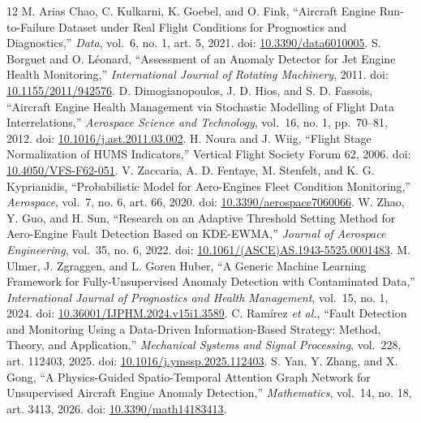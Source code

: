 \documentclass[preprint,12pt]{elsarticle}
\begin{document}
\begin{thebibliography}{12}
\small\setlength{\itemsep}{0pt}
 M. Arias Chao, C. Kulkarni, K. Goebel, and O. Fink, ``Aircraft Engine Run-to-Failure Dataset under Real Flight Conditions for Prognostics and Diagnostics,'' \emph{Data}, vol.~6, no. 1, art. 5, 2021. doi: \href{https://doi.org/10.3390/data6010005}{10.3390/data6010005}.
 S. Borguet and O. Léonard, ``Assessment of an Anomaly Detector for Jet Engine Health Monitoring,'' \emph{International Journal of Rotating Machinery}, 2011. doi: \href{https://doi.org/10.1155/2011/942576}{10.1155/2011/942576}.
 D. Dimogianopoulos, J. D. Hios, and S. D. Fassois, ``Aircraft Engine Health Management via Stochastic Modelling of Flight Data Interrelations,'' \emph{Aerospace Science and Technology}, vol.~16, no. 1, pp.~70--81, 2012. doi: \href{https://doi.org/10.1016/j.ast.2011.03.002}{10.1016/j.ast.2011.03.002}.
 H. Noura and J. Wiig, ``Flight Stage Normalization of HUMS Indicators,'' Vertical Flight Society Forum 62, 2006. doi: \href{https://doi.org/10.4050/VFS-F62-051}{10.4050/VFS-F62-051}.
 V. Zaccaria, A. D. Fentaye, M. Stenfelt, and K. G. Kyprianidis, ``Probabilistic Model for Aero-Engines Fleet Condition Monitoring,'' \emph{Aerospace}, vol.~7, no. 6, art. 66, 2020. doi: \href{https://doi.org/10.3390/aerospace7060066}{10.3390/aerospace7060066}.
 W. Zhao, Y. Guo, and H. Sun, ``Research on an Adaptive Threshold Setting Method for Aero-Engine Fault Detection Based on KDE-EWMA,'' \emph{Journal of Aerospace Engineering}, vol.~35, no. 6, 2022. doi: \href{https://doi.org/10.1061/(ASCE)AS.1943-5525.0001483}{10.1061/(ASCE)AS.1943-5525.0001483}.
 M. Ulmer, J. Zgraggen, and L. Goren Huber, ``A Generic Machine Learning Framework for Fully-Unsupervised Anomaly Detection with Contaminated Data,'' \emph{International Journal of Prognostics and Health Management}, vol.~15, no. 1, 2024. doi: \href{https://doi.org/10.36001/IJPHM.2024.v15i1.3589}{10.36001/IJPHM.2024.v15i1.3589}.
 C. Ramírez \emph{et al.}, ``Fault Detection and Monitoring Using a Data-Driven Information-Based Strategy: Method, Theory, and Application,'' \emph{Mechanical Systems and Signal Processing}, vol.~228, art. 112403, 2025. doi: \href{https://doi.org/10.1016/j.ymssp.2025.112403}{10.1016/j.ymssp.2025.112403}.
 S. Yan, Y. Zhang, and X. Gong, ``A Physics-Guided Spatio-Temporal Attention Graph Network for Unsupervised Aircraft Engine Anomaly Detection,'' \emph{Mathematics}, vol.~14, no. 18, art. 3413, 2026. doi: \href{https://doi.org/10.3390/math14183413}{10.3390/math14183413}.

\end{thebibliography}
\end{document}
